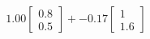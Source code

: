 \documentclass[preview]{standalone}
\begin{document}
\begin{align*}
1.00 \begin{bmatrix} 0.8 \\ 0.5 \end{bmatrix} + -0.17 \begin{bmatrix} 1 \\ 1.6 \end{bmatrix}
\end{align*}
\end{document}
